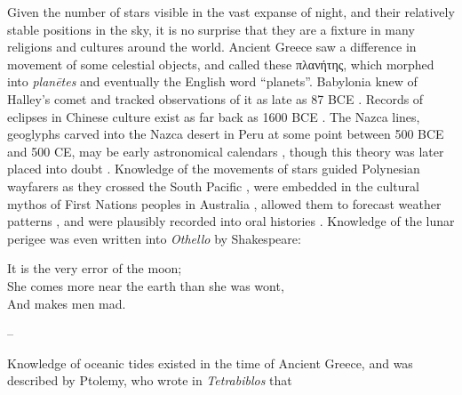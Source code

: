 Given the number of stars visible in the vast expanse of night, and their relatively stable positions in the sky, it is no surprise that they are a fixture in many religions and cultures around the world. Ancient Greece saw a difference in movement of some celestial objects, and called these {\greekscript πλανήτης}, which morphed into \textit{plan\=etes} and eventually the English word ``planets''. Babylonia knew of Halley's comet and tracked observations of it as late as 87 BCE \citep{Stephenson:1985}. Records of eclipses in Chinese culture exist as far back as 1600 BCE \citep{Fang:2015}. The Nazca lines, geoglyphs carved into the Nazca desert in Peru at some point between 500 BCE and 500 CE, may be early astronomical calendars \citep{Kosok:1949}, though this theory was later placed into doubt \citep{Hawkins:1973}. Knowledge of the movements of stars guided Polynesian wayfarers as they crossed the South Pacific \citep{Buck:1938, Hamacher:2022}, were embedded in the cultural mythos of First Nations peoples in Australia \citep{Noon:2022}, allowed them to forecast weather patterns \citep{Hamacher:2019}, and were plausibly recorded into oral histories \citep{Fuller:2017}. Knowledge of the lunar perigee was even written into \textit{Othello} by Shakespeare:

\begin{fanciful}
    It is the very error of the moon; \\
    She comes more near the earth than she was wont, \\
    And makes men mad.
    \begin{flushright}
        -- \citet{Shakespeare:1603}
    \end{flushright}
\end{fanciful}

Knowledge of oceanic tides existed in the time of Ancient Greece, and was described by Ptolemy, who wrote in \textit{Tetrabiblos} that


